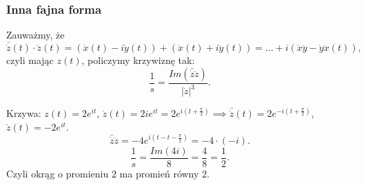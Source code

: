 \documentclass[../main.tex]{subfiles}
\begin{document}
        \subsubsection{Inna fajna forma}
        Zauważmy, że $\bar{\dot{z}}(t) \cdot \ddot{z}(t) = \left( \dot{x}(t) - i\dot{y}(t) \right) + \left( \ddot{x}(t) + i\ddot{y}(t) \right) = \ldots + i\left( \dot{x}\ddot{y} - \dot{y}\ddot{x}(t) \right),$ czyli mając $z(t)$, policzymy krzywiznę tak:
        \[
            \frac{1}{s} = \frac{Im(\bar{\dot{z}}\ddot{z})}{\left| \dot{z} \right| ^3}
        .\]
    \begin{przyklad}
        Krzywa: $z(t) = 2e^{it}$, $\dot{z}(t) = 2ie^{it} = 2e^{i(t+\frac{\pi}{2})} \implies \bar{\dot{z}}(t) = 2e^{-i(t + \frac{\pi}{2})}$, $\ddot{z}(t) = -2e^{it}$.
        \[
            \bar{\dot{z}}\ddot{z} = -4 e^{i(t-t-\frac{\pi}{2})} = -4 \cdot (-i)
        .\]
    \[
        \frac{1}{s} = \frac{Im(4i)}{8} = \frac{4}{8} = \frac{1}{2}
    .\]
Czyli okrąg o promieniu $2$ ma promień równy $2$.
    \end{przyklad}
\end{document}
